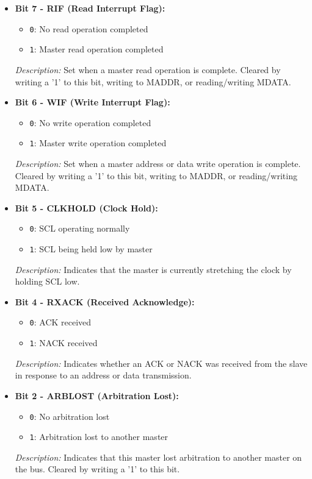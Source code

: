 \begin{itemize}
    \item \textbf{Bit 7 - RIF (Read Interrupt Flag):} 
    \begin{itemize}
        \item \texttt{0}: No read operation completed
        \item \texttt{1}: Master read operation completed
    \end{itemize}
    \textit{Description:} Set when a master read operation is complete. Cleared by writing a '1' to this bit, writing to MADDR, or reading/writing MDATA.
    
    \item \textbf{Bit 6 - WIF (Write Interrupt Flag):} 
    \begin{itemize}
        \item \texttt{0}: No write operation completed
        \item \texttt{1}: Master write operation completed
    \end{itemize}
    \textit{Description:} Set when a master address or data write operation is complete. Cleared by writing a '1' to this bit, writing to MADDR, or reading/writing MDATA.
    
    \item \textbf{Bit 5 - CLKHOLD (Clock Hold):} 
    \begin{itemize}
        \item \texttt{0}: SCL operating normally
        \item \texttt{1}: SCL being held low by master
    \end{itemize}
    \textit{Description:} Indicates that the master is currently stretching the clock by holding SCL low.
    
    \item \textbf{Bit 4 - RXACK (Received Acknowledge):} 
    \begin{itemize}
        \item \texttt{0}: ACK received
        \item \texttt{1}: NACK received
    \end{itemize}
    \textit{Description:} Indicates whether an ACK or NACK was received from the slave in response to an address or data transmission.
    
    \item \textbf{Bit 2 - ARBLOST (Arbitration Lost):} 
    \begin{itemize}
        \item \texttt{0}: No arbitration lost
        \item \texttt{1}: Arbitration lost to another master
    \end{itemize}
    \textit{Description:} Indicates that this master lost arbitration to another master on the bus. Cleared by writing a '1' to this bit.
    

\end{itemize}
